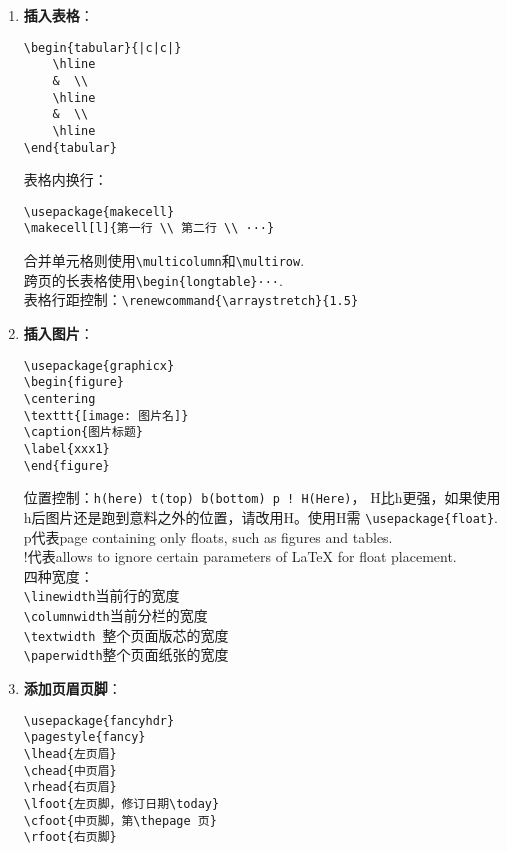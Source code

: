 \documentclass{article}
\newcommand{\q}{\quad}
\renewcommand{\today}{\number\year-\number\month-\number\day}
\begin{document}
\begin{multicols}{2}
\begin{enumerate}
        \item \textbf{插入表格}：
              \begin{lstlisting}
\begin{tabular}{|c|c|}
    \hline
    &  \\
    \hline
    &  \\
    \hline
\end{tabular}    
\end{lstlisting}
              表格内换行：
              \begin{lstlisting}
\usepackage{makecell}  
\makecell[l]{第一行 \\ 第二行 \\ ···}  
\end{lstlisting}
              合并单元格则使用\verb|\multicolumn|和\verb|\multirow|.\\
              跨页的长表格使用\verb|\begin{longtable}···|. \\
              表格行距控制：\verb|\renewcommand{\arraystretch}{1.5}|


        \item \textbf{插入图片}：
              \begin{lstlisting}
\usepackage{graphicx}    
\begin{figure}
\centering
\texttt{[image: 图片名]}
\caption{图片标题}
\label{xxx1}
\end{figure} 
\end{lstlisting}
              位置控制：\verb|h(here) t(top) b(bottom) p ! H(Here)|，
              H比h更强，如果使用h后图片还是跑到意料之外的位置，请改用H。使用H需
              \verb|\usepackage{float}|.  \\
              p代表page containing only floats, such as figures and tables. \\
              !代表allows to ignore certain parameters of LaTeX for float placement.\\
              四种宽度：\\
              \verb|\linewidth|\q\q 当前行的宽度 \\
              \verb|\columnwidth|\q 当前分栏的宽度 \\
              \verb|\textwidth|\q\q\ 整个页面版芯的宽度 \\
              \verb|\paperwidth|\q\q 整个页面纸张的宽度


        \item \textbf{添加页眉页脚}：
              \begin{lstlisting}
\usepackage{fancyhdr}
\pagestyle{fancy}
\lhead{左页眉}
\chead{中页眉}
\rhead{右页眉}
\lfoot{左页脚，修订日期\today}
\cfoot{中页脚，第\thepage 页}
\rfoot{右页脚}
\end{lstlisting}


\end{enumerate}
\end{multicols}
\end{document}
